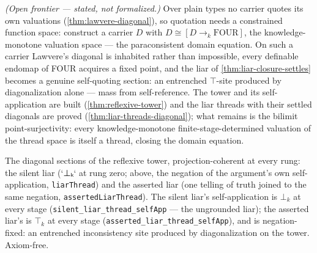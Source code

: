 \begin{theorem}\label{thm:reflexive-value-carrier}\notready{}
\emph{(Open frontier --- stated, not formalized.)} Over plain types no
carrier quotes its own valuations (\cref{thm:lawvere-diagonal}), so
quotation needs a constrained function space: construct a carrier $D$ with
$D \cong [D \to_k \mathrm{FOUR}]$, the knowledge-monotone valuation space
--- the paraconsistent domain equation. On such a carrier Lawvere's
diagonal is inhabited rather than impossible, every definable endomap of
FOUR acquires a fixed point, and the liar of
\cref{thm:liar-closure-settles} becomes a genuine self-quoting section:
an entrenched $\top$-site produced by diagonalization alone --- mass from
self-reference. The tower and its self-application are built
(\cref{thm:reflexive-tower}) and the liar threads with their settled
diagonals are proved (\cref{thm:liar-threads-diagonal}); what remains is
the bilimit point-surjectivity: every knowledge-monotone
finite-stage-determined valuation of the thread space is itself a
thread, closing the domain equation.
\end{theorem}

\begin{theorem}\label{thm:liar-threads-diagonal}\leanok{}
The diagonal sections of the reflexive tower, projection-coherent at
every rung: the silent liar (`⊥ₖ` at rung zero; above, the negation of
the argument's own self-application, \texttt{liarThread}) and the
asserted liar (one telling of truth joined to the same negation,
\texttt{assertedLiarThread}). The silent liar's self-application is
$\bot_k$ at every stage (\texttt{silent\_liar\_thread\_selfApp} --- the
ungrounded liar); the asserted liar's is $\top_k$ at every stage
(\texttt{asserted\_liar\_thread\_selfApp}), and is negation-fixed: an
entrenched inconsistency site produced by diagonalization on the tower.
Axiom-free.
\end{theorem}
